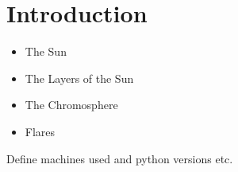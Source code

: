 \chapter{Introduction}

\begin{itemize}
    \item The Sun
    \item The Layers of the Sun
    \item The Chromosphere
    \item Flares
\end{itemize}




Define machines used and python versions etc.